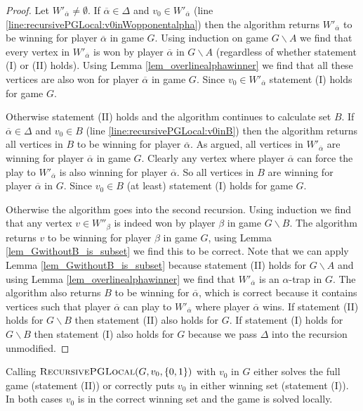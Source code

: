 \begin{theorem}
\begin{proof}
			Let $W'_{\overline{\alpha}} \neq \emptyset$. If $\overline{\alpha} \in \Delta$ and $v_0 \in W'_{\overline{\alpha}}$ (line \ref{line:recursivePGLocal:v0inWopponentalpha}) then the algorithm returns $W'_{\overline{\alpha}}$ to be winning for player $\overline{\alpha}$ in game $G$. Using induction on game $G \backslash A$ we find that every vertex in $W'_{\overline{\alpha}}$ is won by player $\overline{\alpha}$ in $G \backslash A$ (regardless of whether statement (I) or (II) holds). Using Lemma \ref{lem_overlinealphawinner} we find that all these vertices are also won for player $\overline{\alpha}$ in game $G$. Since $v_0 \in W'_{\overline{\alpha}}$ statement (I) holds for game $G$.
			
			Otherwise statement (II) holds and the algorithm continues to calculate set $B$. If $\overline{\alpha} \in \Delta$ and $v_0 \in B$ (line \ref{line:recursivePGLocal:v0inB}) then the algorithm returns all vertices in $B$ to be winning for player $\overline{\alpha}$. As argued, all vertices in $W'_{\overline{\alpha}}$ are winning for player $\overline{\alpha}$ in game $G$. Clearly any vertex where player $\overline{\alpha}$ can force the play to $W'_{\overline{\alpha}}$ is also winning for player $\overline{\alpha}$. So all vertices in $B$ are winning for player $\overline{\alpha}$ in $G$. Since $v_0 \in B$ (at least) statement (I) holds for game $G$.
			
			Otherwise the algorithm goes into the second recursion. Using induction we find that any vertex $v \in W''_\beta$ is indeed won by player $\beta$ in game $G\backslash B$. The algorithm returns $v$ to be winning for player $\beta$ in game $G$, using Lemma \ref{lem_GwithoutB_is_subset} we find this to be correct. Note that we can apply Lemma \ref{lem_GwithoutB_is_subset} because statement (II) holds for $G\backslash A$ and using Lemma \ref{lem_overlinealphawinner} we find that $W'_{\overline{\alpha}}$ is an $\alpha$-trap in $G$. The algorithm also returns $B$ to be winning for $\overline{\alpha}$, which is correct because it contains vertices such that player $\overline{\alpha}$ can play to $W'_{\overline{\alpha}}$ where player $\overline{\alpha}$ wins. If statement (II) holds for $G\backslash B$ then statement (II) also holds for $G$. If statement (I) holds for $G\backslash B$ then statement (I) also holds for $G$ because we pass $\Delta$ into the recursion unmodified.
		\end{proof}
\end{theorem}
Calling $\textsc{RecursivePGLocal}(G, v_0, \{0,1\})$ with $v_0$ in $G$ either solves the full game (statement (II)) or correctly puts $v_0$ in either winning set (statement (I)). In both cases $v_0$ is in the correct winning set and the game is solved locally.

